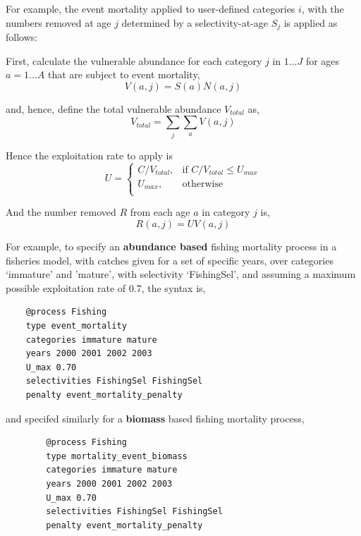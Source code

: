 For example, the event mortality applied to user-defined categories $i$, with the numbers removed at age $j$ determined by a selectivity-at-age $S_j$ is applied as follows:

First, calculate the vulnerable abundance for each category $j$ in $1 \ldots J$ for ages $a = 1 \ldots A$ that are subject to event mortality,
\begin{equation}
  V(a,j) = S(a) N(a,j)
\end{equation}

and, hence, define the total vulnerable abundance $V_{total}$ as,
\begin{equation}
  V_{total}  = \sum\limits_j {\sum\limits_a {V(a,j)}}
\end{equation}

Hence the exploitation rate to apply is
\begin{equation}
U = \begin{cases}
  C/V_{total}, & \text{if $C/V_{total} \leq U_{max}$} \\
  U_{max}, & \text{otherwise}\\
  \end{cases}
\end{equation}

And the number removed $R$ from each age $a$ in category $j$ is,
\begin{equation}
  R(a,j) = UV(a,j)
\end{equation}

For example, to specify an \textbf{abundance based} fishing mortality process in a fisheries model, with catches given for a set of specific years, over categories `immature' and 'mature', with selectivity `FishingSel', and assuming a maximum possible exploitation rate of 0.7, the syntax is,

{\small{\begin{verbatim}
	@process Fishing
	type event_mortality
	categories immature mature
	years 2000 2001 2002 2003
	U_max 0.70
	selectivities FishingSel FishingSel
	penalty event_mortality_penalty
	\end{verbatim}}}

and specifed similarly for a \textbf{biomass} based fishing mortality process,

{\small{\begin{verbatim}
		@process Fishing
		type mortality_event_biomass
		categories immature mature
		years 2000 2001 2002 2003
		U_max 0.70
		selectivities FishingSel FishingSel
		penalty event_mortality_penalty
		\end{verbatim}}}

